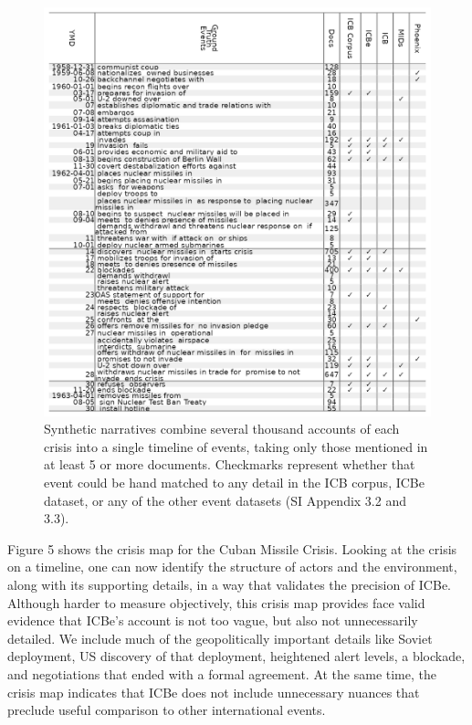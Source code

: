 \documentclass{article}
\begin{document}
\begin{figure}
\hypertarget{fig-recall-cuba}{%
\centering
\includegraphics{case_study_cuban_recall.png}
\caption{Synthetic narratives combine several thousand accounts of each
crisis into a single timeline of events, taking only those mentioned in
at least 5 or more documents. Checkmarks represent whether that event
could be hand matched to any detail in the ICB corpus, ICBe dataset, or
any of the other event datasets (SI Appendix 3.2 and
3.3).}\label{fig-recall-cuba}
}
\end{figure}

Figure 5 shows the crisis map for the Cuban Missile Crisis. Looking at
the crisis on a timeline, one can now identify the structure of actors
and the environment, along with its supporting details, in a way that
validates the precision of ICBe. Although harder to measure objectively,
this crisis map provides face valid evidence that ICBe's account is not
too vague, but also not unnecessarily detailed. We include much of the
geopolitically important details like Soviet deployment, US discovery of
that deployment, heightened alert levels, a blockade, and negotiations
that ended with a formal agreement. At the same time, the crisis map
indicates that ICBe does not include unnecessary nuances that preclude
useful comparison to other international events.
\end{document}
